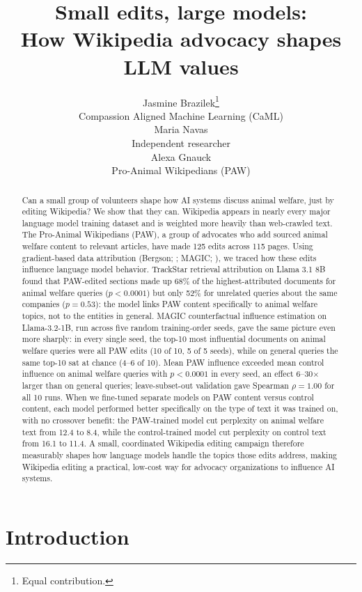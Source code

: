 \documentclass{article}
\title{Small edits, large models:\\How Wikipedia advocacy shapes LLM values}
\author{%
  Jasmine Brazilek\thanks{Equal contribution.}\\
  Compassion Aligned Machine Learning (CaML)\\
  \And
  Maria Navas\footnotemark[1]\\
  Independent researcher\\
  \And
  Alexa Gnauck\\
  Pro-Animal Wikipedians (PAW)\\
}
\begin{document}
\maketitle

\begin{abstract}
Can a small group of volunteers shape how AI systems discuss animal welfare, just by editing Wikipedia? We show that they can. Wikipedia appears in nearly every major language model training dataset and is weighted more heavily than web-crawled text. The Pro-Animal Wikipedians (PAW), a group of advocates who add sourced animal welfare content to relevant articles, have made 125 edits across 115 pages. Using gradient-based data attribution (Bergson; \citealt{lucia2026bergson}; MAGIC; \citealt{ilyas2025magic}), we traced how these edits influence language model behavior. TrackStar retrieval attribution on Llama 3.1 8B found that PAW-edited sections made up 68\% of the highest-attributed documents for animal welfare queries ($p < 0.0001$) but only 52\% for unrelated queries about the same companies ($p = 0.53$): the model links PAW content specifically to animal welfare topics, not to the entities in general. MAGIC counterfactual influence estimation on Llama-3.2-1B, run across five random training-order seeds, gave the same picture even more sharply: in every single seed, the top-10 most influential documents on animal welfare queries were all PAW edits (10 of 10, 5 of 5 seeds), while on general queries the same top-10 sat at chance (4--6 of 10). Mean PAW influence exceeded mean control influence on animal welfare queries with $p < 0.0001$ in every seed, an effect 6--30$\times$ larger than on general queries; leave-subset-out validation gave Spearman $\rho = 1.00$ for all 10 runs. When we fine-tuned separate models on PAW content versus control content, each model performed better specifically on the type of text it was trained on, with no crossover benefit: the PAW-trained model cut perplexity on animal welfare text from 12.4 to 8.4, while the control-trained model cut perplexity on control text from 16.1 to 11.4. A small, coordinated Wikipedia editing campaign therefore measurably shapes how language models handle the topics those edits address, making Wikipedia editing a practical, low-cost way for advocacy organizations to influence AI systems.
\end{abstract}

\section{Introduction}
\end{document}
